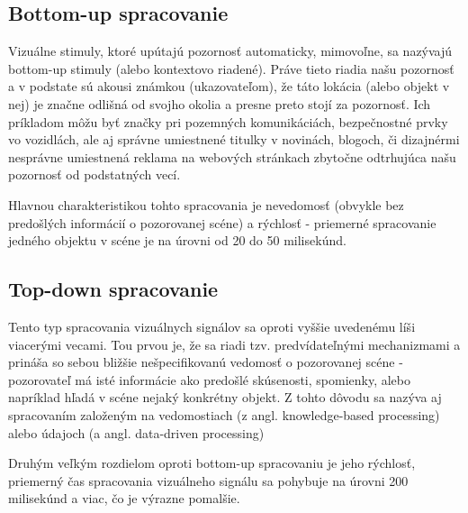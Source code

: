 \subsection{Bottom-up spracovanie}
Vizuálne stimuly, ktoré upútajú pozornosť automaticky, mimovoľne, sa nazývajú bottom-up stimuly (alebo kontextovo riadené). Práve tieto riadia našu pozornosť a v podstate sú akousi známkou (ukazovateľom), že táto lokácia (alebo objekt v nej) je značne odlišná od svojho okolia a presne preto stojí za pozornosť. Ich príkladom môžu byť značky pri pozemných komunikáciách, bezpečnostné prvky vo vozidlách, ale aj správne umiestnené titulky v novinách, blogoch, či dizajnérmi nesprávne umiestnená reklama na webových stránkach zbytočne odtrhujúca našu pozornosť od podstatných vecí. 

Hlavnou charakteristikou tohto spracovania je nevedomosť (obvykle bez predošlých informácií o pozorovanej scéne) a rýchlosť - priemerné spracovanie jedného objektu v scéne je na úrovni od 20 do 50 milisekúnd\cite{itti2001computational}.


\subsection{Top-down spracovanie}
Tento typ spracovania vizuálnych signálov sa oproti vyššie uvedenému líši viacerými vecami. Tou prvou je, že sa riadi tzv. predvídateľnými mechanizmami a prináša so sebou bližšie nešpecifikovanú vedomosť o pozorovanej scéne - pozorovateľ má isté informácie ako predošlé skúsenosti, spomienky, alebo napríklad hľadá v scéne nejaký konkrétny objekt. Z tohto dôvodu sa nazýva aj spracovaním založeným na vedomostiach (z angl. knowledge-based processing\cite{goldstein2008blackwell}) alebo údajoch (a angl. data-driven processing\cite{gregory1974concepts})

Druhým veľkým rozdielom oproti bottom-up spracovaniu je jeho rýchlosť, priemerný čas spracovania vizuálneho signálu sa pohybuje na úrovni 200 milisekúnd\cite{itti2001computational} a viac, čo je výrazne pomalšie.


